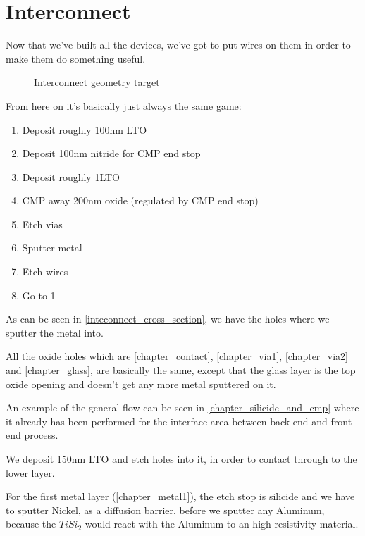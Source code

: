 \section{Interconnect}

Now that we've built all the devices, we've got to put wires on them in order to make them do something useful.

\begin{figure}[H]
	\centering
	\begin{tikzpicture}[node distance = 3cm, auto, thick,scale=\CrossAndTopSectionBig, every node/.style={transform shape}]
		
	\end{tikzpicture}
	\caption{Interconnect geometry target}
	\label{inteconnect_cross_section}
\end{figure}

From here on it's basically just always the same game:
\begin{enumerate}
	\item Deposit roughly 100nm LTO
	\item Deposit 100nm nitride for CMP end stop
	\item Deposit roughly 1\um LTO
	\item CMP away 200nm oxide (regulated by CMP end stop)
	\item Etch vias
	\item Sputter metal
	\item Etch wires
	\item Go to 1
\end{enumerate}

As can be seen in \autoref{inteconnect_cross_section}, we have the holes where we sputter the metal into.

All the oxide holes which are \autoref{chapter_contact}, \autoref{chapter_via1}, \autoref{chapter_via2} and \autoref{chapter_glass}, are basically the same,
except that the glass layer is the top oxide opening and doesn't get any more metal sputtered on it.

An example of the general flow can be seen in \autoref{chapter_silicide_and_cmp} where it already has been performed for the interface area between back end and front end process.

We deposit 150nm LTO and etch holes into it, in order to contact through to the lower layer.

For the first metal layer (\autoref{chapter_metal1}), the etch stop is silicide and we have to sputter Nickel, as a diffusion barrier, before we sputter any Aluminum,
because the $Ti Si_2$ would react with the Aluminum to an high resistivity material.


